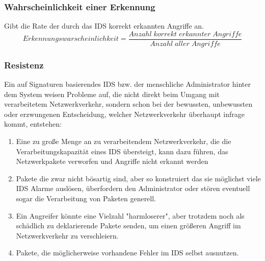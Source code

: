 \subsubsection{Wahrscheinlichkeit einer Erkennung}
Gibt die Rate der durch das IDS korrekt erkannten Angriffe an.\\
\[Erkennungswarscheinlichkeit  = \frac{Anzahl\;korrekt\;erkannter\;Angriffe} {Anzahl\;aller\;Angriffe}\]
\subsubsection{Resistenz}
Ein auf Signaturen basierendes IDS bzw. der menschliche Administrator hinter dem System weisen Probleme auf, die nicht direkt beim Umgang mit verarbeitetem Netzwerkverkehr, sondern schon bei der bewussten, unbewussten oder erzwungenen Entscheidung, welcher Netzwerkverkehr überhaupt infrage kommt, entstehen:
\begin{enumerate}
\item{Eine zu große Menge an zu verarbeitendem Netzwerkverkehr, die die Verarbeitungskapazität eines IDS übersteigt, kann dazu führen, das Netzwerkpakete verworfen und Angriffe nicht erkannt werden}
\item{Pakete die zwar nicht bösartig sind, aber so konstruiert das sie möglichst viele IDS Alarme auslösen, überfordern den Administrator oder stören eventuell sogar die Verarbeitung von Paketen generell. }
\item{Ein Angreifer könnte eine Vielzahl "harmloserer", aber trotzdem noch als schädlich zu deklarierende Pakete senden, um einen größeren Angriff im Netzwerkverkehr zu verschleiern.}
\item{Pakete, die möglicherweise vorhandene Fehler im IDS selbst ausnutzen.}
\end{enumerate}
